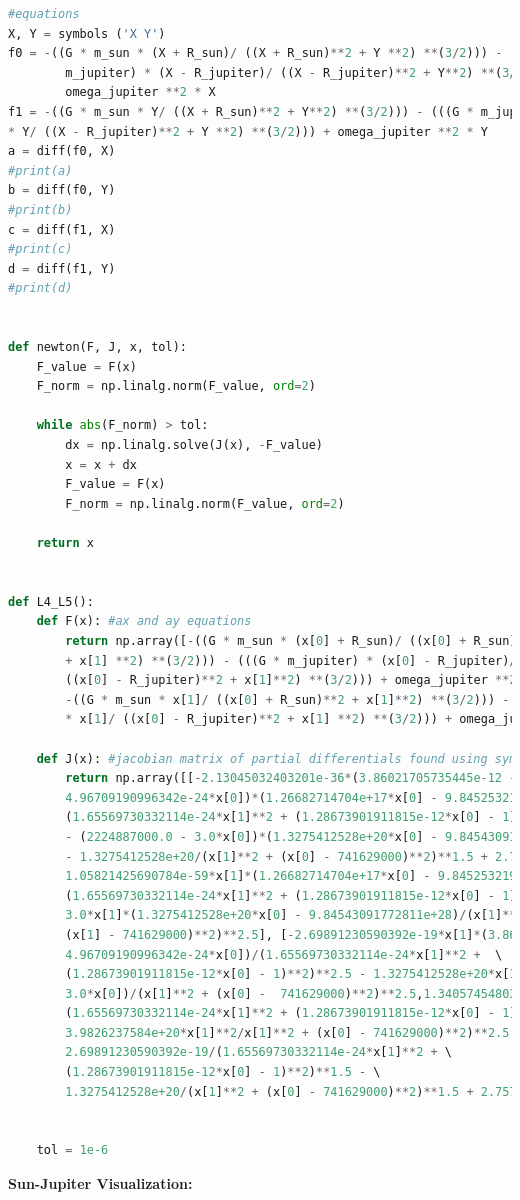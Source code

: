 \documentclass[linenumbers,RNAAS,trackchanges]{aastex631}
\begin{document}
\begin{lstlisting}[language=Python]
#equations
X, Y = symbols ('X Y')
f0 = -((G * m_sun * (X + R_sun)/ ((X + R_sun)**2 + Y **2) **(3/2))) - (((G * \
        m_jupiter) * (X - R_jupiter)/ ((X - R_jupiter)**2 + Y**2) **(3/2))) + \ 
        omega_jupiter **2 * X 
f1 = -((G * m_sun * Y/ ((X + R_sun)**2 + Y**2) **(3/2))) - (((G * m_jupiter) \ 
* Y/ ((X - R_jupiter)**2 + Y **2) **(3/2))) + omega_jupiter **2 * Y
a = diff(f0, X)
#print(a)
b = diff(f0, Y)
#print(b)
c = diff(f1, X)
#print(c)
d = diff(f1, Y)
#print(d)


def newton(F, J, x, tol):
    F_value = F(x)
    F_norm = np.linalg.norm(F_value, ord=2) 
    
    while abs(F_norm) > tol:
        dx = np.linalg.solve(J(x), -F_value)
        x = x + dx
        F_value = F(x)
        F_norm = np.linalg.norm(F_value, ord=2)
 
    return x


def L4_L5():
    def F(x): #ax and ay equations
        return np.array([-((G * m_sun * (x[0] + R_sun)/ ((x[0] + R_sun)**2 \
        + x[1] **2) **(3/2))) - (((G * m_jupiter) * (x[0] - R_jupiter)/ \
        ((x[0] - R_jupiter)**2 + x[1]**2) **(3/2))) + omega_jupiter **2 * x[0], \
        -((G * m_sun * x[1]/ ((x[0] + R_sun)**2 + x[1]**2) **(3/2))) - (((G * m_jupiter) \ 
        * x[1]/ ((x[0] - R_jupiter)**2 + x[1] **2) **(3/2))) + omega_jupiter **2 * x[1]])

    def J(x): #jacobian matrix of partial differentials found using sympy
        return np.array([[-2.13045032403201e-36*(3.86021705735445e-12 - \
        4.96709190996342e-24*x[0])*(1.26682714704e+17*x[0] - 9.84525321932184e+28)/ \
        (1.65569730332114e-24*x[1]**2 + (1.28673901911815e-12*x[0] - 1)**2)**2.5 
        - (2224887000.0 - 3.0*x[0])*(1.3275412528e+20*x[0] - 9.84543091772811e+28)/(x[1]**2 + (x[0] - 741629000)**2)**2.5 - 2.69891230590392e-19/(1.65569730332114e-24*x[1]**2 + (1.28673901911815e-12*x[0] - 1)**2)**1.5 \
        - 1.3275412528e+20/(x[1]**2 + (x[0] - 741629000)**2)**1.5 + 2.75713150761897e-16, \ 
        1.05821425690784e-59*x[1]*(1.26682714704e+17*x[0] - 9.84525321932184e+28)/ \ 
        (1.65569730332114e-24*x[1]**2 + (1.28673901911815e-12*x[0] - 1)**2)**2.5 + \ 
        3.0*x[1]*(1.3275412528e+20*x[0] - 9.84543091772811e+28)/(x[1]**2 + \ 
        (x[1] - 741629000)**2)**2.5], [-2.69891230590392e-19*x[1]*(3.86021705735445e-12 - \ 
        4.96709190996342e-24*x[0])/(1.65569730332114e-24*x[1]**2 +  \ 
        (1.28673901911815e-12*x[0] - 1)**2)**2.5 - 1.3275412528e+20*x[1]*(2224887000.0 - \ 
        3.0*x[0])/(x[1]**2 + (x[0] -  741629000)**2)**2.5,1.34057454803561e-42*x[1]**2/ \ 
        (1.65569730332114e-24*x[1]**2 + (1.28673901911815e-12*x[0] - 1)**2)**2.5 +  \ 
        3.9826237584e+20*x[1]**2/x[1]**2 + (x[0] - 741629000)**2)**2.5 - \ 
        2.69891230590392e-19/(1.65569730332114e-24*x[1]**2 + \ 
        (1.28673901911815e-12*x[0] - 1)**2)**1.5 - \ 
        1.3275412528e+20/(x[1]**2 + (x[0] - 741629000)**2)**1.5 + 2.75713150761897e-16]])


    tol = 1e-6
\end{lstlisting}
\begin{center} \textbf{Sun-Jupiter Visualization:} \end{center}
\end{document}
